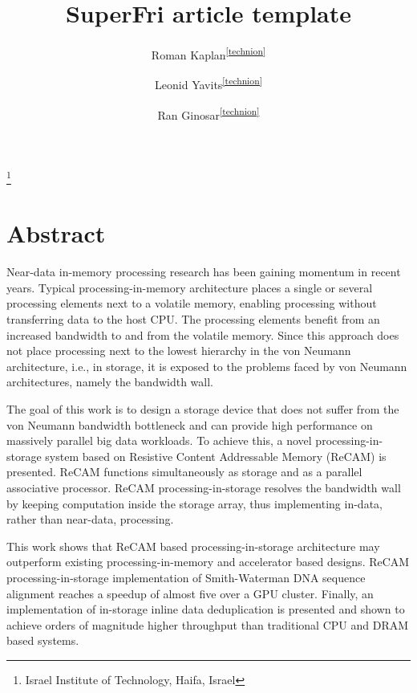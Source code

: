 \documentclass{superfri}
\begin{document}
\footnote{\label{technion}Israel Institute of Technology, Haifa, Israel}
\author{Roman Kaplan\textsuperscript{\ref{technion}} \and Leonid Yavits\textsuperscript{\ref{technion}} \and Ran Ginosar\textsuperscript{\ref{technion}}}

\title{SuperFri article template}

\maketitle{}

\begin{abstract}

\end{abstract}

\section*{Abstract}
\label{sec:abstract}
Near-data in-memory processing research has been gaining momentum in recent years. Typical processing-in-memory architecture places a single or several processing elements next to a volatile memory, enabling processing without transferring data to the host CPU. The processing elements benefit from an increased bandwidth to and from the volatile memory. Since this approach does not place processing next to the lowest hierarchy in the von Neumann architecture, i.e., in storage, it is exposed to the problems faced by von Neumann architectures, namely the bandwidth wall. 

The goal of this work is to design a storage device that does not suffer from the von Neumann bandwidth bottleneck and can provide high performance on massively parallel big data workloads. To achieve this, a novel processing-in-storage system based on Resistive Content Addressable Memory (ReCAM) is presented. ReCAM functions simultaneously as storage and as a parallel associative processor. ReCAM processing-in-storage resolves the bandwidth wall by keeping computation inside the storage array, thus implementing in-data, rather than near-data, processing. 

This work shows that ReCAM based processing-in-storage architecture may outperform existing processing-in-memory and accelerator based designs. ReCAM processing-in-storage implementation of Smith-Waterman DNA sequence alignment reaches a speedup of almost five over a GPU cluster. Finally, an implementation of in-storage inline data deduplication is presented and shown to achieve orders of magnitude higher throughput than traditional CPU and DRAM based systems.
\end{document}
